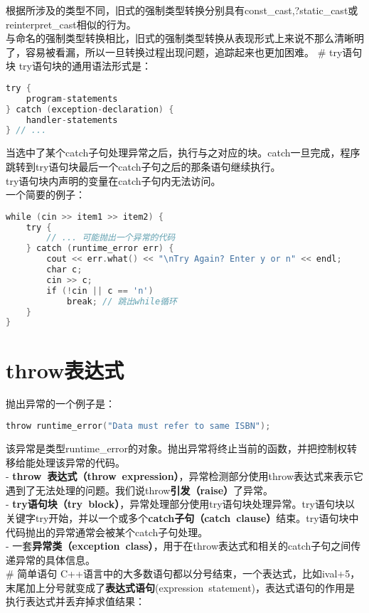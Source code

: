 \documentclass[
  a4paper,
  oneside,tablecaptionabove
]{scrbook}
\begin{document}
根据所涉及的类型不同，旧式的强制类型转换分别具有const\_cast,?static\_cast或reinterpret\_cast相似的行为。\\
与命名的强制类型转换相比，旧式的强制类型转换从表现形式上来说不那么清晰明了，容易被看漏，所以一旦转换过程出现问题，追踪起来也更加困难。
\# try语句块 try语句块的通用语法形式是：

\begin{lstlisting}[language={C++}]
try {
    program-statements
} catch (exception-declaration) {
    handler-statements
} // ...
\end{lstlisting}

当选中了某个catch子句处理异常之后，执行与之对应的块。catch一旦完成，程序跳转到try语句块最后一个catch子句之后的那条语句继续执行。\\
try语句块内声明的变量在catch子句内无法访问。\\
一个简要的例子：

\begin{lstlisting}[language={C++}]
while (cin >> item1 >> item2) {
    try {
        // ... 可能抛出一个异常的代码
    } catch (runtime_error err) {
        cout << err.what() << "\nTry Again? Enter y or n" << endl;
        char c;
        cin >> c;
        if (!cin || c == 'n')
            break; // 跳出while循环
    }
}
\end{lstlisting}

\chapter{throw表达式}\label{throwux8868ux8fbeux5f0f}

抛出异常的一个例子是：

\begin{lstlisting}[language={C++}]
throw runtime_error("Data must refer to same ISBN");
\end{lstlisting}

该异常是类型runtime\_error的对象。抛出异常将终止当前的函数，并把控制权转移给能处理该异常的代码。\\
-
\textbf{throw~表达式（throw~expression）}，异常检测部分使用throw表达式来表示它遇到了无法处理的问题。我们说throw\textbf{引发（raise）}了异常。\\
-
\textbf{try语句块（try~block）}，异常处理部分使用try语句块处理异常。try语句块以关键字try开始，并以一个或多个\textbf{catch子句（catch~clause）}结束。try语句块中代码抛出的异常通常会被某个catch子句处理。\\
-
一套\textbf{异常类（exception~class）}，用于在throw表达式和相关的catch子句之间传递异常的具体信息。\\
\# 简单语句
C++语言中的大多数语句都以分号结束，一个表达式，比如ival+5，末尾加上分号就变成了\textbf{表达式语句}(expression~statement)，表达式语句的作用是执行表达式并丢弃掉求值结果：
\end{document}
